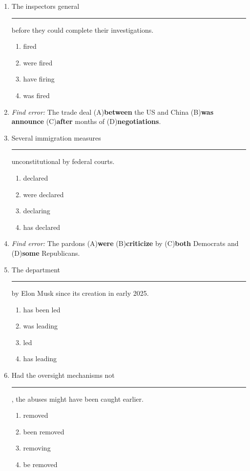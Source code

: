 \documentclass[10pt,a4paper]{article}
\begin{document}
\begin{enumerate}[label=\textbf{\arabic*.}, leftmargin=*]
\item The inspectors general \rule{2cm}{0.4pt} before they could
complete their investigations.
\begin{enumerate}[label=(\Alph*)]
\item fired \item were fired \item have firing \item was fired
\end{enumerate}

\item \textit{Find error:}
The trade deal (A)\textbf{between} the US and China
(B)\textbf{was announce} (C)\textbf{after} months of
(D)\textbf{negotiations}.

\item Several immigration measures \rule{2cm}{0.4pt} unconstitutional
by federal courts.
\begin{enumerate}[label=(\Alph*)]
\item declared \item were declared \item declaring \item has declared
\end{enumerate}

\item \textit{Find error:}
The pardons (A)\textbf{were} (B)\textbf{criticize} by
(C)\textbf{both} Democrats and (D)\textbf{some} Republicans.

\item The department \rule{2cm}{0.4pt} by Elon Musk since its
creation in early 2025.
\begin{enumerate}[label=(\Alph*)]
\item has been led \item was leading \item led \item has leading
\end{enumerate}

\item Had the oversight mechanisms not \rule{2cm}{0.4pt}, the
abuses might have been caught earlier.
\begin{enumerate}[label=(\Alph*)]
\item removed \item been removed \item removing \item be removed
\end{enumerate}
\end{enumerate}
\end{document}
